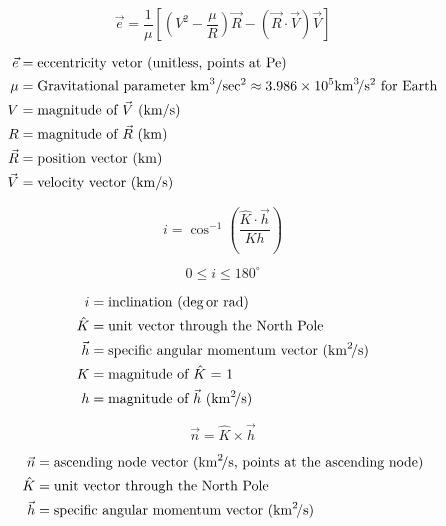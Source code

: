 \documentclass{article}
\newcommand{\myvarmukm}{\mu &= \text{Gravitational parameter \si{\kilo\meter\cubed\per\sec\squared}} \approx 3.986 \times 10^5 \si{\kilo\meter\cubed\per\second\squared} \text{ for Earth}}
\begin{document}
\begin{multicols}{3}
	\begin{equation*}
	\boxed{\vec{e} = \dfrac{1}{\mu}\left[\left(V^2 - \dfrac{\mu}{R}\right)\vec{R} - (\vec{R}\cdot\vec{V})\vec{V}\right]}
	\end{equation*}

	\vfill\null
	\columnbreak

	\begin{align*}
	\vec{e} &= \text{eccentricity vetor (unitless, points at Pe)}\\
	\myvarmukm \\
	V &= \text{magnitude of $\vec{V}$ (\si{\kilo\meter\per\second})}\\
	R &= \text{magnitude of $\vec{R}$ (\si{\kilo\meter})}\\
	\vec{R} &= \text{position vector (\si{\kilo\meter})}\\
	\vec{V} &= \text{velocity vector (\si{\kilo\meter\per\second})}\\
	\end{align*}
\end{multicols}

\begin{multicols}{3}
	\begin{equation*}
	\boxed{i = \cos^{-1}\left(\dfrac{\hat{K} \cdot \vec{h}}{K h}\right)}
	\end{equation*}

	\begin{equation*}
	0 \leq i \leq 180^\circ
	\end{equation*}
	\vfill\null
	\columnbreak

	\begin{align*}
	i &= \text{inclination (\si{\deg \text{or } \radian})}\\
	\hat{K} &= \text{unit vector through the North Pole}\\
	\vec{h} &= \text{specific angular momentum vector (\si{\kilo\meter\squared\per\second})}\\
	K &= \text{magnitude of $\hat{K}$ = 1}\\
	h &= \text{magnitude of $\vec{h}$ (\si{\kilo\meter\squared\per\second})}\\
	\end{align*}
\end{multicols}

\begin{multicols}{3}
	\begin{equation*}
	\boxed{\vec{n} = \hat{K} \times \vec{h}}
	\end{equation*}
	\vfill\null
	\columnbreak

	\begin{align*}
	\vec{n} &= \text{ascending node vector (\si{\kilo\meter\squared\per\second}, points at the ascending node)}\\
	\hat{K} &= \text{unit vector through the North Pole}\\
	\vec{h} &= \text{specific angular momentum vector (\si{\kilo\meter\squared\per\second})}\\
	\end{align*}
\end{multicols}
\end{document}
